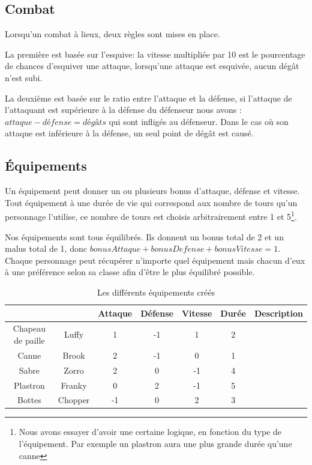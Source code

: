 \documentclass[12pt,a4paper,openany]{book}
\begin{document}
\subsection{Combat}
Lorsqu'un combat à lieux, deux règles sont mises en place.

La première est basée sur l'esquive: la vitesse multipliée par 10 est le pourcentage de chances d’esquiver une attaque, lorsqu'une attaque est esquivée, aucun
dégât n'est subi. 

La deuxième est basée sur le ratio entre l'attaque et la défense, si l'attaque de l'attaquant est supérieure à la défense du défenseur nous avons : $attaque
- défense =  dégâts$ qui sont infligés au défenseur. Dans le cas où son attaque est inférieure à la défense, un seul point de dégât est causé.

	\subsection{Équipements}
	 Un équipement peut donner un ou plusieurs bonus d'attaque, défense et vitesse. Tout équipement à une durée de vie qui correspond aux nombre de tours qu'un
	 personnage l'utilise, ce nombre de tours est choisis arbitrairement entre 1 et 5\footnote{Nous avons essayer d'avoir une certaine logique, en fonction du
	 type de l'équipement. Par exemple un plastron aura une plus grande durée qu'une canne}.

	 Nos équipements sont tous équilibrés. Ils donnent un bonus total de 2 et un malus total de 1, donc $bonusAttaque+bonusDefense+bonusVitesse = 1$.
	 Chaque personnage peut récupérer n'importe quel équipement mais chacun d’eux à une préférence selon sa classe afin d'être le plus équilibré possible.

	 \begin{table}[H]
		 \centering
		 \normalsize
	 \begin{tabular}{cc|ccccp{5.0cm}}
			&& Attaque & Défense & Vitesse & Durée&Description\\
			\hline
			{Chapeau de paille} & Luffy & 1 & -1 & 1 & 2 & \footnotesize \\
			\hline
			{Canne} & Brook & 2 & -1 & 0 & 1 & \footnotesize \\
			\hline
			{Sabre} & Zorro & 2 & 0 & -1& 4& \footnotesize \\
			\hline
			{Plastron} & Franky & 0 & 2 & -1 & 5 & \footnotesize \\
			\hline
			{Bottes} & Chopper&-1&0&2&3& \footnotesize \\
			\hline
		\end{tabular}
		\caption{Les différents équipements créés}
	\end{table}
\end{document}
